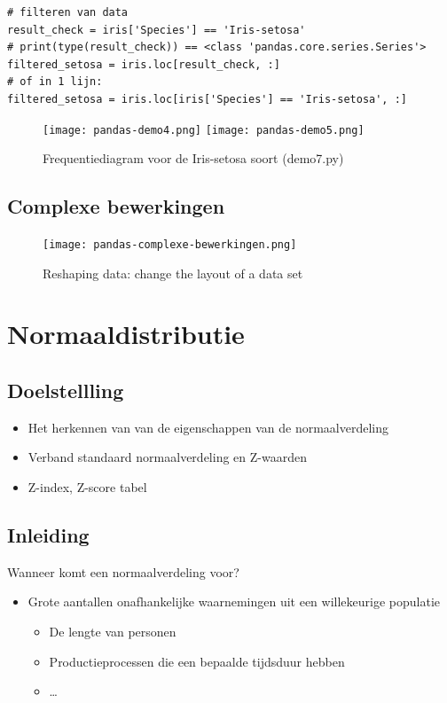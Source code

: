 \documentclass{article}
\begin{document}
\begin{verbatim}
# filteren van data
result_check = iris['Species'] == 'Iris-setosa'
# print(type(result_check)) == <class 'pandas.core.series.Series'>
filtered_setosa = iris.loc[result_check, :]
# of in 1 lijn:
filtered_setosa = iris.loc[iris['Species'] == 'Iris-setosa', :]
\end{verbatim}

\begin{figure}[H]
    \centering
    \texttt{[image: pandas-demo4.png]}
    \texttt{[image: pandas-demo5.png]}
    \caption{Frequentiediagram voor de Iris-setosa soort (demo7.py)}
\end{figure}

\subsection{Complexe bewerkingen}

\begin{figure}[H]
    \centering
    \texttt{[image: pandas-complexe-bewerkingen.png]}
    \caption{Reshaping data: change the layout of a data set}
\end{figure}

\section{Normaaldistributie}

\subsection{Doelstellling}

\begin{itemize}
    \item Het herkennen van van de eigenschappen van de normaalverdeling
    \item Verband standaard normaalverdeling en Z-waarden
    \item Z-index, Z-score tabel
\end{itemize}

\subsection{Inleiding}

Wanneer komt een normaalverdeling voor?

\begin{itemize}
    \item Grote aantallen onafhankelijke waarnemingen uit een willekeurige populatie
    \begin{itemize}
        \item De lengte van personen
        \item Productieprocessen die een bepaalde tijdsduur hebben
        \item \dots
    \end{itemize}
\end{itemize}
\end{document}
